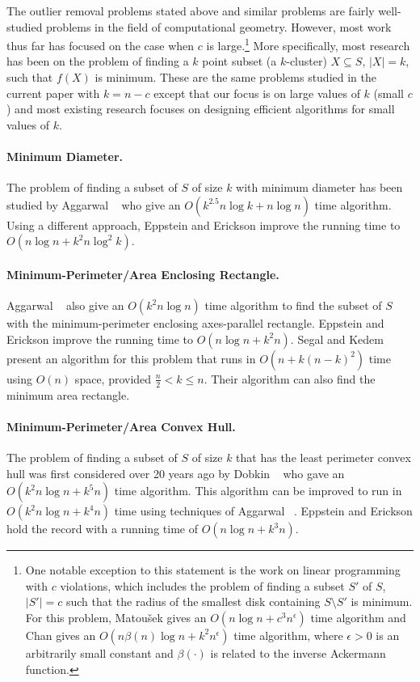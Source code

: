 \documentclass[lotsofwhite]{patmorin}
\begin{document}
The outlier removal problems stated above and similar problems are
fairly well-studied problems in the field of computational geometry.
However, most work thus far has focused on the case when $c$ is
large.\footnote{One notable exception to this statement is the work on
linear programming with $c$ violations, which includes the problem of
finding a subset $S'$ of $S$, $|S'|=c$ such that the radius of the
smallest disk containing $S\setminus S'$ is minimum.  For this
problem, Matou\v{s}ek gives an $O(n\log n + c^3 n^{\epsilon})$ time
algorithm \cite{m95} and Chan \cite{c05} gives an $O(n\beta(n)\log n +
k^2n^\epsilon)$ time algorithm, where $\epsilon >0$ is an arbitrarily
small constant and $\beta(\cdot)$ is related to the inverse Ackermann
function.} More specifically, most research has been on the problem of
finding a $k$ point subset (a $k$-cluster) $X\subseteq S$, $|X|=k$,
such that $f(X)$ is minimum. These are the same problems studied in
the current paper with $k=n-c$ except that our focus is on large
values of $k$ (small $c$) and most existing research focuses on
designing efficient algorithms for small values of $k$.

\paragraph{Minimum Diameter.} The problem of finding a subset of $S$ of size
$k$ with minimum diameter has been studied by Aggarwal \etal\
\cite{aiks89} who give an $O(k^{2.5}n\log k+n\log n)$ time algorithm.
Using a different approach, Eppstein and Erickson \cite{ee94} improve
the running time to $O(n\log n + k^2 n\log^2 k)$.

\paragraph{Minimum-Perimeter/Area Enclosing Rectangle.} Aggarwal
\etal\ \cite{aiks89} also give an $O(k^2n\log n)$ time algorithm to
find the subset of $S$ with the minimum-perimeter enclosing
axes-parallel rectangle.  Eppstein and Erickson \cite{ee94} improve
the running time to $O(n\log n + k^2 n)$.  Segal and Kedem \cite{sk98}
present an algorithm for this problem that runs in $O(n+k(n-k)^2)$
time using $O(n)$ space, provided $\frac{n}{2}<k\le n$. Their
algorithm can also find the minimum area rectangle.

\paragraph{Minimum-Perimeter/Area Convex Hull.} The problem of finding a
subset of $S$ of size $k$ that has the least perimeter convex hull was
first considered over 20 years ago by Dobkin \etal\ \cite{ddg83} who
gave an $O(k^2n\log n + k^5 n)$ time algorithm.  This algorithm can be
improved to run in $O(k^2 n\log n + k^4 n)$ time using techniques of
Aggarwal \etal\ \cite{aiks89}.  Eppstein and Erickson \cite{ee94} hold
the record with a running time of $O(n\log n + k^3 n)$.
\end{document}

